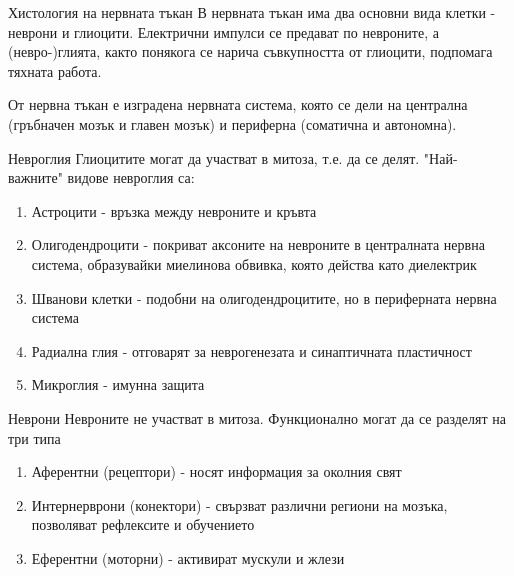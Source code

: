 \begin{frame}[t]{Хистология на нервната тъкан}
    В нервната тъкан има два основни вида клетки - неврони и глиоцити.
    Електрични импулси се предават по невроните, а (невро-)глията, 
    както понякога се нарича съвкупността от глиоцити, подпомага тяхната работа.

    От нервна тъкан е изградена нервната система, която се дели на централна (гръбначен мозък и главен мозък) и периферна (соматична и автономна).

\end{frame}

\begin{frame}[t]{Невроглия}
    Глиоцитите могат да участват в митоза, т.е. да се делят. "Най-важните" видове невроглия са:
    \begin{enumerate}
        \item Астроцити - връзка между невроните и кръвта
        \item Олигодендроцити - покриват аксоните на невроните в централната нервна система, образувайки миелинова обвивка, която действа като диелектрик
        \item Шванови клетки - подобни на олигодендроцитите, но в периферната нервна система
        \item Радиална глия - отговарят за неврогенезата и синаптичната пластичност
        \item Микроглия - имунна защита
    \end{enumerate}
\end{frame}

\begin{frame}[t]{Неврони}
    Невроните не участват в митоза. Функционално могат да се разделят на три типа
    \begin{enumerate}
        \item Аферентни (рецептори) - носят информация за околния свят 
        \item Интернерврони (конектори) - свързват различни региони на мозъка, позволяват рефлексите и обучението 
        \item Еферентни (моторни) - активират мускули и жлези
    \end{enumerate}
\end{frame}